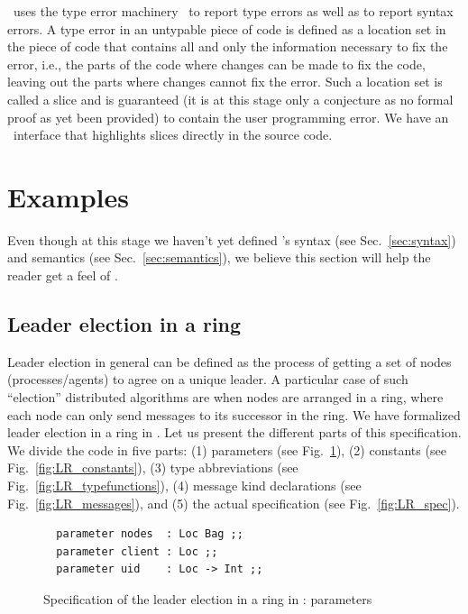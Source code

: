 \documentclass[final]{article}
\begin{document}
\eml\ uses the type error
machinery~\cite{Haack+Wells:2003,Haack+Wells:2004,Rahli:2011} to
report type errors as well as to report syntax errors.  A type error
in an untypable piece of code is defined as a location set in the
piece of code that contains all and only the information necessary to
fix the error, i.e., the parts of the code where changes can be made
to fix the code, leaving out the parts where changes cannot fix the
error.  Such a location set is called a slice and is guaranteed (it is
at this stage only a conjecture as no formal proof as yet been
provided) to contain the user programming error.  We have an
\emacs\ interface that highlights slices directly in the source code.



\section{Examples}


Even though at this stage we haven't yet defined \eml's syntax (see
Sec.~\ref{sec:syntax}) and semantics (see Sec.~\ref{sec:semantics}),
we believe this section will help the reader get a feel of \eml.


\subsection{Leader election in a ring}


Leader election in general can be defined as the process of getting a
set of nodes (processes/agents) to agree on a unique leader.  A
particular case of such ``election'' distributed algorithms are when
nodes are arranged in a ring, where each node can only send messages
to its successor in the ring.
%
We have formalized leader election in a ring in \eml.
%
Let us present the different parts of this specification.
%
We divide the code in five parts: (1) parameters (see
Fig.~\ref{fig:LR_parameters}), (2) constants (see
Fig.~\ref{fig:LR_constants}), (3) type abbreviations (see
Fig.~\ref{fig:LR_typefunctions}), (4) message kind declarations (see
Fig.~\ref{fig:LR_messages}), and (5) the actual specification (see
Fig.~\ref{fig:LR_spec}).

\begin{figure}[!t]
  \begin{center}
\begin{lstlisting}
  parameter nodes  : Loc Bag ;;
  parameter client : Loc ;;
  parameter uid    : Loc -> Int ;;
\end{lstlisting}
  \end{center}
  \caption{Specification of the leader election in a ring in \eml: parameters}
  \label{fig:LR_parameters}
\end{figure}
\end{document}

